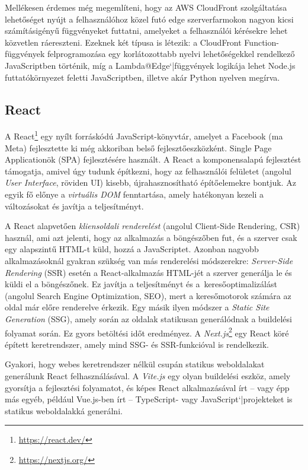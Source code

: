Mellékesen érdemes még megemlíteni, hogy az AWS CloudFront szolgáltatása lehetőséget nyújt a felhasználóhoz közel futó edge szerverfarmokon nagyon kicsi számításigényű függvényeket futtatni, amelyeket a felhasználói kérésekre lehet közvetlen ráereszteni. Ezeknek két típusa is létezik: a CloudFront Function-függvények felprogramozása egy korlátozottabb nyelvi lehetőségekkel rendelkező JavaScriptben történik, míg a Lambda@Edge`|függvények logikája lehet Node.js futtatókörnyezet feletti JavaScriptben, illetve akár Python nyelven megírva.

\subsection{React}

A React\footnote{\url{https://react.dev/}} egy nyílt forráskódú JavaScript-könyvtár, amelyet a Facebook (ma Meta) fejlesztette ki még akkoriban belső fejlesztőeszközként. Single Page Applicationök (SPA) fejlesztésére használt. A React a komponensalapú fejlesztést támogatja, amivel úgy tudunk építkezni, hogy az felhasználói felületet (angolul \emph{User Interface}, röviden UI) kisebb, újrahasznosítható építőelemekre bontjuk. Az egyik fő előnye a \emph{virtuális DOM} fenntartása, amely hatékonyan kezeli a változásokat és javítja a teljesítményt.

A React alapvetően \emph{kliensoldali renderelést} (angolul Client-Side Rendering, CSR) használ, ami azt jelenti, hogy az alkalmazás a böngészőben fut, és a szerver csak egy alapszintű HTML-t küld, hozzá a JavaScriptet. Azonban nagyobb alkalmazásoknál gyakran szükség van más renderelési módszerekre: \emph{Server-Side Rendering} (SSR) esetén a React-alkalmazás HTML-jét a szerver generálja le és küldi el a böngészőnek. Ez javítja a teljesítményt és a~keresőoptimalizálást (angolul Search Engine Optimization, SEO), mert a keresőmotorok számára az oldal már előre renderelve érkezik. Egy másik ilyen módszer a \emph{Static Site Generation} (SSG), amely során az oldalak statikusan generálódnak a buildelési folyamat során. Ez gyors betöltési időt eredményez. A \emph{Next.js}\footnote{\url{https://nextjs.org/}} egy React köré épített keretrendszer, amely mind SSG- és SSR-funkcióval is rendelkezik.

Gyakori, hogy webes keretrendszer nélkül csupán statikus weboldalakat generálunk React felhasználásával. A \emph{Vite.js} egy olyan buildelési eszköz, amely gyorsítja a fejlesztési folyamatot, és képes React alkalmazásával írt -- vagy épp más egyéb, például Vue.js-ben írt -- TypeScript- vagy JavaScript`|projekteket is statikus weboldalakká generálni.

